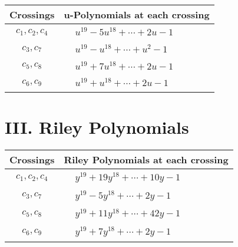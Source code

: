 \documentclass[1p]{elsarticle_modified}
\theoremstyle{definition}
\begin{document}
\begin{tabular}{m{50pt}|m{274pt}}
Crossings & \hspace{64pt}u-Polynomials at each crossing \\
\hline $$\begin{aligned}c_{1},c_{2},c_{4}\end{aligned}$$&$\begin{aligned}
&u^{19}-5 u^{18}+\cdots+2 u-1
\end{aligned}$\\
\hline $$\begin{aligned}c_{3},c_{7}\end{aligned}$$&$\begin{aligned}
&u^{19}- u^{18}+\cdots+u^2-1
\end{aligned}$\\
\hline $$\begin{aligned}c_{5},c_{8}\end{aligned}$$&$\begin{aligned}
&u^{19}+7 u^{18}+\cdots+2 u-1
\end{aligned}$\\
\hline $$\begin{aligned}c_{6},c_{9}\end{aligned}$$&$\begin{aligned}
&u^{19}+u^{18}+\cdots+2 u-1
\end{aligned}$\\
\hline
\end{tabular}\newpage\renewcommand{\arraystretch}{1}
\centering \section*{ III. Riley Polynomials}
\begin{tabular}{m{50pt}|m{274pt}}
Crossings & \hspace{64pt}Riley Polynomials at each crossing \\
\hline $$\begin{aligned}c_{1},c_{2},c_{4}\end{aligned}$$&$\begin{aligned}
&y^{19}+19 y^{18}+\cdots+10 y-1
\end{aligned}$\\
\hline $$\begin{aligned}c_{3},c_{7}\end{aligned}$$&$\begin{aligned}
&y^{19}-5 y^{18}+\cdots+2 y-1
\end{aligned}$\\
\hline $$\begin{aligned}c_{5},c_{8}\end{aligned}$$&$\begin{aligned}
&y^{19}+11 y^{18}+\cdots+42 y-1
\end{aligned}$\\
\hline $$\begin{aligned}c_{6},c_{9}\end{aligned}$$&$\begin{aligned}
&y^{19}+7 y^{18}+\cdots+2 y-1
\end{aligned}$\\
\hline
\end{tabular}
\vskip 2pc
\end{document}
